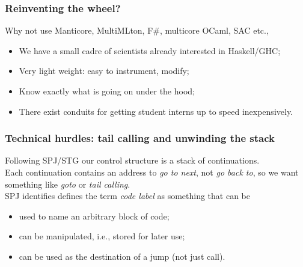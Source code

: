 \documentclass{beamer}
\begin{document}
\begin{frame}
\frametitle{Reinventing the wheel?}  Why not use Manticore, MultiMLton, F\#,
multicore OCaml, SAC etc., 
\begin{itemize}
  \item<2-> We have a small cadre of scientists already interested in Haskell/GHC;
  \item<3-> Very light weight:  easy to instrument, modify;
  \item<4-> Know exactly what is going on under the hood;
  \item<5-> There exist conduits for getting student interns up to speed inexpensively.
\end{itemize}
\end{frame}


\begin{frame}
\frametitle{Technical hurdles:  tail calling and unwinding the stack}
Following SPJ/STG our control structure is a stack of continuations.  
\\\vspace{0.1in}
Each continuation contains an address to \emph{go to next}, not \emph{go back
  to}, so we want something like \emph{goto} or \emph{tail calling}.
\\\vspace{0.1in}
SPJ identifies defines the term \emph{code label} as something that can be
\begin{itemize}
  \item used to name an arbitrary block of code;
  \item can be manipulated, i.e., stored for later use;
  \item can be used as the destination of a jump (not just call).
\end{itemize}
\end{frame}
\end{document}
